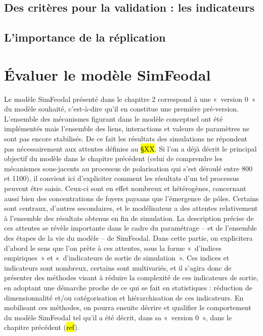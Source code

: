 \subsection{Des critères pour la validation : les indicateurs}

\subsection{L'importance de la réplication}

\clearpage
\section{Évaluer le modèle SimFeodal}

Le modèle SimFeodal présenté dans le chapitre 2 correspond à une « version 0 » du modèle souhaité, c'est-à-dire qu'il en constitue une première pré-version.
	L'ensemble des mécanismes figurant dans le modèle conceptuel ont été implémentés mais l'ensemble des liens, interactions et valeurs de paramètres ne sont pas encore stabilisés.
	De ce fait les résultats des simulations ne répondent pas nécessairement aux attentes définies au \hl{§XX}.
	Si l'on a déjà décrit le principal objectif du modèle dans le chapitre précédent (celui de comprendre les mécanismes sous-jacents au processus de polarisation qui s'est déroulé entre 800 et 1100), il convient ici d'expliciter comment les résultats d'un tel processus peuvent être saisis.
Ceux-ci sont en effet nombreux et hétérogènes, concernant aussi bien des concentrations de foyers paysans que l'émergence de pôles.
Certains sont centraux, d'autres secondaires, et le modélisateur a des attentes relativement à l'ensemble des résultats obtenus en fin de simulation.
La description précise de ces attentes se révèle importante dans le cadre du paramétrage -- et de l'ensemble des étapes de la vie du modèle -- de SimFeodal.
Dans cette partie, on explicitera d'abord le sens que l'on prête à ces attentes, sous la forme « d'indices empiriques » et « d'indicateurs de sortie de simulation ».
Ces indices et indicateurs sont nombreux, certains sont multivariés, et il s'agira donc de présenter des méthodes visant à réduire la complexité de ces indicateurs de sortie, en adoptant une démarche proche de ce qui se fait en statistiques : réduction de dimensionnalité et/ou catégorisation et hiérarchisation de ces indicateurs.
En mobilisant ces méthodes, on pourra ensuite décrire et qualifier le comportement du modèle SimFeodal tel qu'il a été décrit, dans sa « version 0 », dans le chapitre précédent (\hl{ref}).

